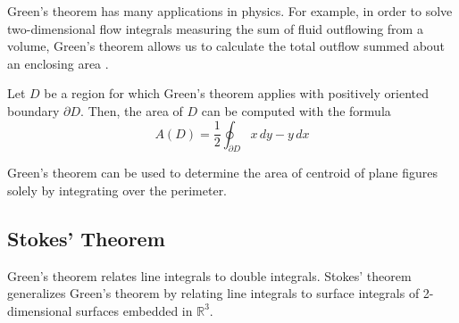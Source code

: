   Green's theorem has many applications in physics. For example, in order to solve two-dimensional flow integrals measuring the sum of fluid outflowing from a volume, Green's theorem allows us to calculate the total outflow summed about an enclosing area . 
		
  \begin{corollary}
		Let $D$ be a region for which Green's theorem applies with positively oriented boundary $\partial D$. Then, the area of $D$ can be computed with the formula
		\begin{equation}
			A(D) = \frac{1}{2} \oint_{\partial D} x \, d y - y \, d x
		\end{equation}
  \end{corollary}
		
  Green's theorem can be used to determine the area of centroid of plane figures solely by integrating over the perimeter. 
		
\subsection{Stokes' Theorem}
		
  Green's theorem relates line integrals to double integrals. Stokes' theorem generalizes Green's theorem by relating line integrals to surface integrals of 2-dimensional surfaces embedded in $\mathbb{R}^3$. 
		
